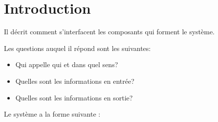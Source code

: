 \section{Introduction}

Il décrit comment s’interfacent les composants qui forment le système.

Les questions auquel il répond sont les suivantes:

\begin{itemize}
\item Qui appelle qui et dans quel sens?
\item Quelles sont les informations en entrée?
\item Quelles sont les informations en sortie?
\end{itemize}

Le système a la forme suivante :


